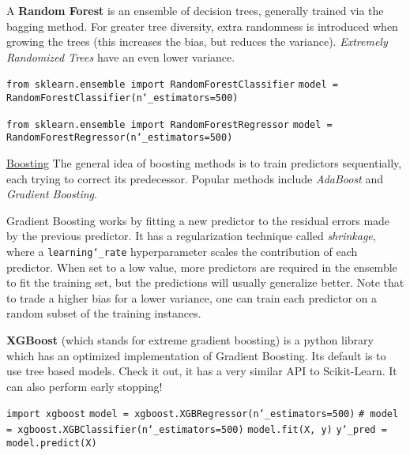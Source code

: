 A \textbf{Random Forest} is an ensemble of decision trees,
generally trained via the bagging method.
For greater tree diversity,
extra randomness is introduced when growing the trees
(this increases the bias, but reduces the variance).
\textit{Extremely Randomized Trees} have an even lower variance.

\texttt{from sklearn.ensemble import RandomForestClassifier}\newline
\texttt{model = RandomForestClassifier(n\char`_estimators=500)}

\texttt{from sklearn.ensemble import RandomForestRegressor}\newline
\texttt{model = RandomForestRegressor(n\char`_estimators=500)}\newline

\underline{Boosting}\newline
The general idea of boosting methods is to train predictors sequentially,
each trying to correct its predecessor.
Popular methods include \textit{AdaBoost} and \textit{Gradient Boosting}.

Gradient Boosting works by fitting a new predictor
to the residual errors made by the previous predictor.
% 
It has a regularization technique called \textit{shrinkage},
where a \texttt{learning\char`_rate} hyperparameter scales the contribution of each predictor.
When set to a low value,
more predictors are required in the ensemble to fit the training set,
but the predictions will usually generalize better.
% 
Note that to trade a higher bias for a lower variance,
one can train each predictor on a random subset of the training instances.

\textbf{XGBoost} (which stands for extreme gradient boosting)
is a python library which has an \newline optimized implementation of Gradient Boosting.
Its default is to use tree based models.\newline
Check it out, it has a very similar API to Scikit-Learn. It can also perform early stopping!

\texttt{import xgboost}\newline
\newline
\texttt{model = xgboost.XGBRegressor(n\char`_estimators=500)}\newline
\texttt{\# model = xgboost.XGBClassifier(n\char`_estimators=500)}\newline
\newline
\texttt{model.fit(X, y)}\newline
\texttt{y\char`_pred = model.predict(X)}

